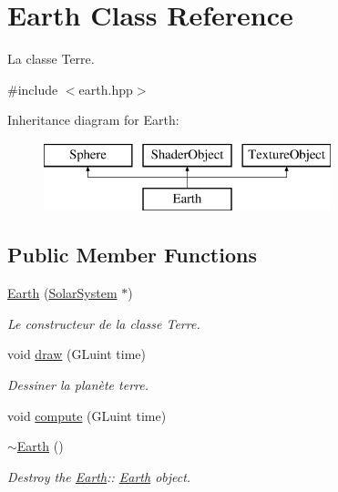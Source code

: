 \hypertarget{classEarth}{}\section{Earth Class Reference}
\label{classEarth}


La classe Terre.  




{\ttfamily \#include $<$earth.\+hpp$>$}

Inheritance diagram for Earth\+:\begin{figure}[H]
\begin{center}
\leavevmode
\includegraphics[height=2.000000cm]{classEarth}
\end{center}
\end{figure}
\subsection*{Public Member Functions}
\begin{DoxyCompactItemize}
\item 
\mbox{\hyperlink{classEarth_ac63bc8757dd60da6a19555690e3a1cd4}{Earth}} (\mbox{\hyperlink{classSolarSystem}{Solar\+System}} $\ast$)
\begin{DoxyCompactList}\small\item\em Le constructeur de la classe Terre. \end{DoxyCompactList}\item 
void \mbox{\hyperlink{classEarth_aa71da3add5a747c3e85f70e5291effaf}{draw}} (G\+Luint time)
\begin{DoxyCompactList}\small\item\em Dessiner la planète terre. \end{DoxyCompactList}\item 
void \mbox{\hyperlink{classEarth_a4f2e2881f1f05c3dea103425be8b16f1}{compute}} (G\+Luint time)
\item 
\mbox{\hyperlink{classEarth_ac215e2016eccb7a4764ad40048f78b74}{$\sim$\+Earth}} ()
\begin{DoxyCompactList}\small\item\em Destroy the \mbox{\hyperlink{classEarth}{Earth}}\+:\+: \mbox{\hyperlink{classEarth}{Earth}} object. \end{DoxyCompactList}\end{DoxyCompactItemize}
